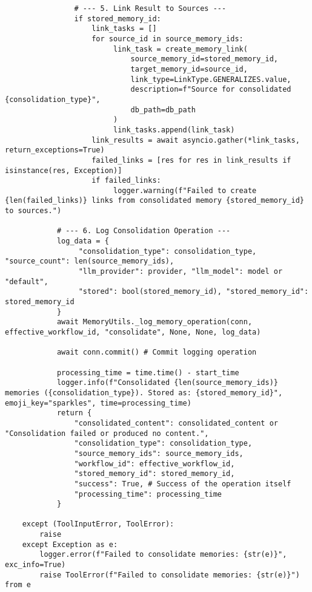 \documentclass[12pt,a4paper]{article}
\begin{document}
\begin{pageablecode}
\begin{verbatim}
                # --- 5. Link Result to Sources ---
                if stored_memory_id:
                    link_tasks = []
                    for source_id in source_memory_ids:
                         link_task = create_memory_link(
                             source_memory_id=stored_memory_id,
                             target_memory_id=source_id,
                             link_type=LinkType.GENERALIZES.value,
                             description=f"Source for consolidated {consolidation_type}",
                             db_path=db_path
                         )
                         link_tasks.append(link_task)
                    link_results = await asyncio.gather(*link_tasks, return_exceptions=True)
                    failed_links = [res for res in link_results if isinstance(res, Exception)]
                    if failed_links:
                         logger.warning(f"Failed to create {len(failed_links)} links from consolidated memory {stored_memory_id} to sources.")

            # --- 6. Log Consolidation Operation ---
            log_data = {
                 "consolidation_type": consolidation_type, "source_count": len(source_memory_ids),
                 "llm_provider": provider, "llm_model": model or "default",
                 "stored": bool(stored_memory_id), "stored_memory_id": stored_memory_id
            }
            await MemoryUtils._log_memory_operation(conn, effective_workflow_id, "consolidate", None, None, log_data)

            await conn.commit() # Commit logging operation

            processing_time = time.time() - start_time
            logger.info(f"Consolidated {len(source_memory_ids)} memories ({consolidation_type}). Stored as: {stored_memory_id}", emoji_key="sparkles", time=processing_time)
            return {
                "consolidated_content": consolidated_content or "Consolidation failed or produced no content.",
                "consolidation_type": consolidation_type,
                "source_memory_ids": source_memory_ids,
                "workflow_id": effective_workflow_id,
                "stored_memory_id": stored_memory_id,
                "success": True, # Success of the operation itself
                "processing_time": processing_time
            }

    except (ToolInputError, ToolError):
        raise
    except Exception as e:
        logger.error(f"Failed to consolidate memories: {str(e)}", exc_info=True)
        raise ToolError(f"Failed to consolidate memories: {str(e)}") from e


\end{verbatim}
\end{pageablecode}
\end{document}
